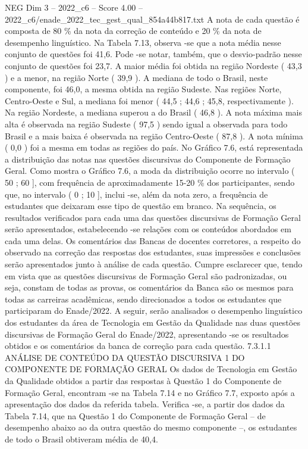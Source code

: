 \begin{textsample}{NEG Dim 3 – 2022\_c6 – Score 4.00 – 2022\_c6/enade\_2022\_tec\_gest\_qual\_854a44b817.txt}
A nota de cada questão é composta de 80 \% da nota da correção de conteúdo e 20 \% da nota de desempenho linguístico.
Na Tabela 7.13, observa -se que a nota média nesse conjunto de questões foi 41,6.
Pode -se notar, também, que o desvio-padrão nesse conjunto de questões foi 23,7.
A maior média foi obtida na região Nordeste ( 43,3 ) e a menor, na região Norte ( 39,9 ).
A mediana de todo o Brasil, neste componente, foi 46,0, a mesma obtida na região Sudeste.
Nas regiões Norte, Centro-Oeste e Sul, a mediana foi menor ( 44,5 ; 44,6 ; 45,8, respectivamente ).
Na região Nordeste, a mediana superou a do Brasil ( 46,8 ).
A nota máxima mais alta é observada na região Sudeste ( 97,5 ) sendo igual a observada para todo Brasil e a mais baixa é observada na região Centro-Oeste ( 87,8 ).
A nota mínima ( 0,0 ) foi a mesma em todas as regiões do país.
No Gráfico 7.6, está representada a distribuição das notas nas questões discursivas do Componente de Formação Geral.
Como mostra o Gráfico 7.6, a moda da distribuição ocorre no intervalo ( 50 ; 60 ], com frequência de aproximadamente 15-20 \% dos participantes, sendo que, no intervalo ( 0 ; 10 ], inclui -se, além da nota zero, a frequência de estudantes que deixaram esse tipo de questão em branco.
Na sequência, os resultados verificados para cada uma das questões discursivas de Formação Geral serão apresentados, estabelecendo -se relações com os conteúdos abordados em cada uma delas.
Os comentários das Bancas de docentes corretores, a respeito do observado na correção das respostas dos estudantes, suas impressões e conclusões serão apresentados junto à análise de cada questão.
Cumpre esclarecer que, tendo em vista que as questões discursivas de Formação Geral são padronizadas, ou seja, constam de todas as provas, os comentários da Banca são os mesmos para todas as carreiras acadêmicas, sendo direcionados a todos os estudantes que participaram do Enade/2022.
A seguir, serão analisados o desempenho linguístico dos estudantes da área de Tecnologia em Gestão da Qualidade nas duas questões discursivas de Formação Geral do Enade/2022, apresentando -se os resultados obtidos e os comentários da banca de correção para cada questão. 7.3.1.1 ANÁLISE DE CONTEÚDO DA QUESTÃO DISCURSIVA 1 DO COMPONENTE DE FORMAÇÃO GERAL Os dados de Tecnologia em Gestão da Qualidade obtidos a partir das respostas à Questão 1 do Componente de Formação Geral, encontram -se na Tabela 7.14 e no Gráfico 7.7, exposto após a apresentação dos dados da referida tabela.
Verifica -se, a partir dos dados da Tabela 7.14, que na Questão 1 do Componente de Formação Geral – de desempenho abaixo ao da outra questão do mesmo componente –, os estudantes de todo o Brasil obtiveram média de 40,4.

\end{textsample}
